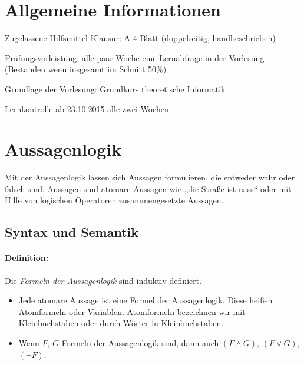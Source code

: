 








\maketitle
\newpage
\tableofcontents
\newpage


\section*{Allgemeine Informationen}

Zugelassene Hilfsmittel Klausur: A-4 Blatt (doppelseitig, handbeschrieben)

Prüfungsvorleistung: alle paar Woche eine Lernabfrage in der Vorlesung (Bestanden wenn insgesamt im Schnitt 50\%)

Grundlage der Vorlesung: Grundkurs theoretische Informatik \cite{hollas2007grundkurs}

Lernkontrolle ab 23.10.2015 alle zwei Wochen.

\section{Aussagenlogik}

Mit der Aussagenlogik lassen sich Aussagen formulieren, die entweder wahr oder falsch sind. Aussagen sind atomare Aussagen wie „die Straße ist nass“ oder mit Hilfe von logischen Operatoren zusammengesetzte Aussagen.

\subsection{Syntax und Semantik}

\paragraph{Definition:} Die \emph{Formeln der Aussagenlogik} sind induktiv definiert.

\begin{itemize}
\item Jede atomare Aussage ist eine Formel der Aussagenlogik. Diese heißen Atomformeln oder Variablen. 
Atomformeln bezeichnen wir mit Kleinbuchstaben oder durch Wörter in Kleinbuchstaben.
\item Wenn $F$, $G$ Formeln der Aussagenlogik sind, dann auch $(F \wedge G)$, $(F\vee G)$, $(\neg F)$.
\end{itemize}

